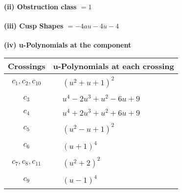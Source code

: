 \documentclass[1p]{elsarticle_modified}
\theoremstyle{definition}
\begin{document}
\flushleft \textbf{(ii) Obstruction class $= 1$}\\~\\
\flushleft \textbf{(iii) Cusp Shapes $= -4 a u-4 u-4$}\\~\\
\newpage\renewcommand{\arraystretch}{1}
\flushleft \textbf{(iv) u-Polynomials at the component}\newline \\
\begin{tabular}{m{50pt}|m{274pt}}
Crossings & \hspace{64pt}u-Polynomials at each crossing \\
\hline $$\begin{aligned}c_{1},c_{2},c_{10}\end{aligned}$$&$\begin{aligned}
&(u^2+u+1)^2
\end{aligned}$\\
\hline $$\begin{aligned}c_{3}\end{aligned}$$&$\begin{aligned}
&u^4-2 u^3+u^2-6 u+9
\end{aligned}$\\
\hline $$\begin{aligned}c_{4}\end{aligned}$$&$\begin{aligned}
&u^4+2 u^3+u^2+6 u+9
\end{aligned}$\\
\hline $$\begin{aligned}c_{5}\end{aligned}$$&$\begin{aligned}
&(u^2- u+1)^2
\end{aligned}$\\
\hline $$\begin{aligned}c_{6}\end{aligned}$$&$\begin{aligned}
&(u+1)^4
\end{aligned}$\\
\hline $$\begin{aligned}c_{7},c_{8},c_{11}\end{aligned}$$&$\begin{aligned}
&(u^2+2)^2
\end{aligned}$\\
\hline $$\begin{aligned}c_{9}\end{aligned}$$&$\begin{aligned}
&(u-1)^4
\end{aligned}$\\
\hline
\end{tabular}\\~\\
\end{document}
